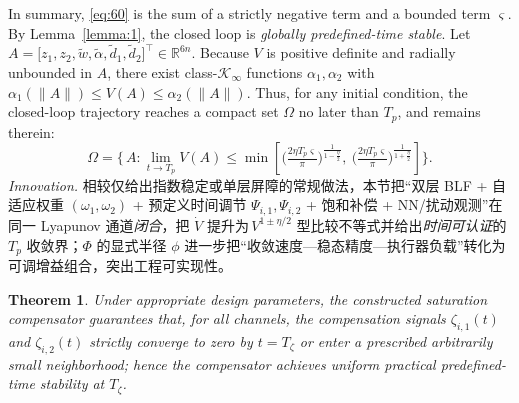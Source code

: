 \documentclass[pdflatex,sn-mathphys-num]{sn-jnl}%
\theoremstyle{thmstyleone}%
\newtheorem{theorem}{Theorem}%
\theoremstyle{thmstyletwo}%
\theoremstyle{thmstylethree}%
\begin{document}
In summary, \cref{eq:60} is the sum of a strictly negative term and a bounded term \(\varsigma\). By Lemma~\ref{lemma:1}, the closed loop is \emph{globally predefined-time stable}. Let
\(A=\big[z_1,z_2,\tilde w,\tilde \alpha,\tilde d_1,\tilde d_2\big]^{\!\top}\in\mathbb{R}^{6n}\).
Because \(V\) is positive definite and radially unbounded in \(A\), there exist
class-\(\mathcal{K}_\infty\) functions \(\alpha_1,\alpha_2\) with
\(\alpha_1(\|A\|)\le V(A)\le \alpha_2(\|A\|)\). Thus, for any initial condition, the closed-loop trajectory reaches a compact set \(\Omega\) no later than \(T_p\), and remains therein:
\begin{equation}\label{eq:62}
  \Omega
  = \Bigg\{\,A : \lim_{t\to T_p} V(A) \le
      \min\!\left[
        \Big(\tfrac{2\eta T_p \varsigma}{\pi}\Big)^{\!\frac{1}{1-\frac{\eta}{2}}},
        \ \Big(\tfrac{2\eta T_p \varsigma}{\pi}\Big)^{\!\frac{1}{1+\frac{\eta}{2}}}
      \right]\!\Bigg\}.
\end{equation}
\noindent\emph{Innovation.} 相较仅给出指数稳定或单层屏障的常规做法，本节把“双层 BLF + 自适应权重 \((\omega_1,\omega_2)\) + 预定义时间调节 \(\Psi_{i,1},\Psi_{i,2}\) + 饱和补偿 + NN/扰动观测”在同一 Lyapunov 通道\emph{闭合}，把 \(\dot V\) 提升为\(\,V^{1\pm \eta/2}\) 型比较不等式并给出\emph{时间可认证}的 \(T_p\) 收敛界；\(\Phi\) 的显式半径 \(\phi\) 进一步把“收敛速度—稳态精度—执行器负载”转化为可调增益组合，突出工程可实现性。







\begin{theorem}
	Under appropriate design parameters, the constructed saturation compensator guarantees that, for all channels, the compensation signals $\zeta_{i,1}(t)$ and $\zeta_{i,2}(t)$ strictly converge to zero by $t=T_{\zeta}$ or enter a prescribed arbitrarily small neighborhood; hence the compensator achieves \emph{uniform practical predefined-time stability} at $T_{\zeta}$.
	\end{theorem}
	
\end{document}

